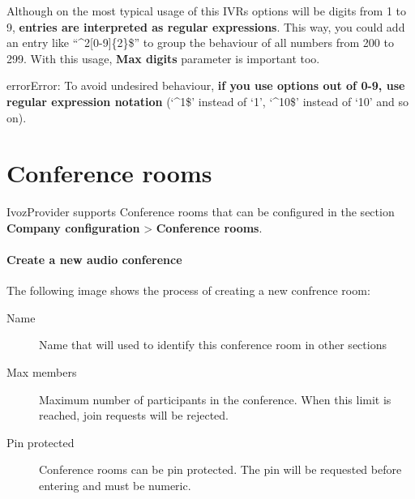 \documentclass[letterpaper,10pt,english]{sphinxmanual}
\begin{document}
Although on the most typical usage of this IVRs options will be digits from 1
to 9, \textbf{entries are interpreted as regular expressions}. This way, you could
add an entry like ``\textasciicircum{}2{[}0-9{]}\{2\}\$'' to group the behaviour of all numbers from 200
to 299. With this usage, \textbf{Max digits} parameter is important too.

\begin{notice}{error}{Error:}
To avoid undesired behaviour, \textbf{if you use options out of 0-9, use
regular expression notation} (`\textasciicircum{}1\$' instead of `1', `\textasciicircum{}10\$' instead
of `10' and so on).
\end{notice}


\section{Conference rooms}
\label{pbx_features/conference_rooms::doc}\label{pbx_features/conference_rooms:conference-rooms}\label{pbx_features/conference_rooms:id1}
IvozProvider supports Conference rooms that can be configured in the section
\textbf{Company configuration} \textgreater{} \textbf{Conference rooms}.
\paragraph{Create a new audio conference}

The following image shows the process of creating a new confrence room:

\noindent{}
\begin{description}
\item[{Name}] \leavevmode{}\label{pbx_features/conference_rooms:term-name}
Name that will used to identify this conference room in other sections

\item[{Max members}] \leavevmode{}\label{pbx_features/conference_rooms:term-max-members}
Maximum number of participants in the conference. When this limit is
reached, join requests will be rejected.

\item[{Pin protected}] \leavevmode{}\label{pbx_features/conference_rooms:term-pin-protected}
Conference rooms can be pin protected. The pin will be requested before
entering and must be numeric.

\end{description}
\end{document}

